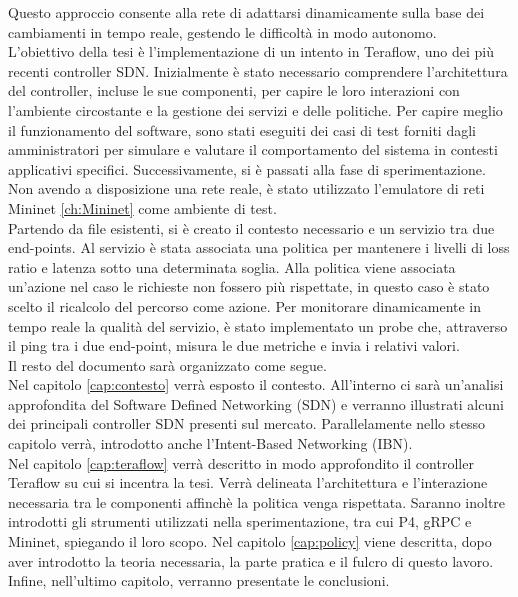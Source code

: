 Questo approccio consente alla rete di adattarsi dinamicamente sulla base dei cambiamenti in tempo reale, gestendo le difficoltà in modo autonomo.
\\L'obiettivo della tesi è l'implementazione di un intento in Teraflow, uno dei più recenti controller SDN.
Inizialmente è stato necessario comprendere l'architettura del controller, incluse le sue componenti, per capire le loro interazioni con l'ambiente circostante e la gestione dei servizi e delle politiche.
Per capire meglio il funzionamento del software, sono stati eseguiti dei casi di test forniti dagli amministratori per simulare e valutare il comportamento del sistema in contesti applicativi specifici.
Successivamente, si è passati alla fase di sperimentazione.
Non avendo a disposizione una rete reale, è stato utilizzato l'emulatore di reti Mininet \ref{ch:Mininet} come ambiente di test.
\\Partendo da file esistenti, si è creato il contesto necessario e un servizio tra due end-points.
Al servizio è stata associata una politica per mantenere i livelli di loss ratio e latenza sotto una determinata soglia.
Alla politica viene associata un'azione nel caso le richieste non fossero più rispettate, in questo caso è stato scelto il ricalcolo del percorso come azione.
Per monitorare dinamicamente in tempo reale la qualità del servizio, è stato implementato un probe che, attraverso il ping tra i due end-point, misura le due metriche e invia 
i relativi valori.
\\Il resto del documento sarà organizzato come segue.
\\Nel capitolo \ref{cap:contesto} verrà esposto il contesto. All'interno ci sarà un'analisi approfondita del Software Defined Networking (SDN)
e verranno illustrati alcuni dei principali controller SDN presenti sul mercato. Parallelamente nello stesso capitolo verrà, introdotto anche l'Intent-Based Networking (IBN).
\\Nel capitolo \ref{cap:teraflow} verrà descritto in modo approfondito il controller Teraflow su cui si incentra la tesi.
Verrà delineata l'architettura e l'interazione necessaria tra le componenti affinchè la politica venga rispettata.
Saranno inoltre introdotti gli strumenti utilizzati nella sperimentazione, tra cui P4, gRPC e Mininet, spiegando il loro scopo.
Nel capitolo \ref{cap:policy} viene descritta, dopo aver introdotto la teoria necessaria, la parte pratica e il fulcro di questo lavoro.
Infine, nell’ultimo capitolo, verranno presentate le conclusioni.
